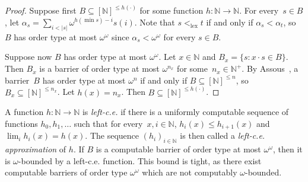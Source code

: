 \documentclass{article}
\newcommand{\NN}[0]{\mathbb{N}}
\newcommand{\lex}{\mathrm{lex}}
\newcommand{\base}{\operatorname{base}}
\numberwithin{theorem}{section}
\newtheorem{lemma}[theorem]{Lemma}
\newcommand{\ludovic}[1]{\textcolor{blue}{#1}}
\newcommand{\lorenzo}[1]{\textcolor{orange}{#1}}
\begin{document}
\begin{proof}
Suppose first $B \subseteq [\NN]^{\leq h(\cdot)}$ for some function $h : \NN \to \NN$.
For every~$s \in B$, let $\alpha_s = \sum_{i < |s|} \omega^{h(\min s)-i} s(i)$. %
Note that $s <_{\lex} t$ if and only if $\alpha_s < \alpha_t$, so $B$ has order type at most $\omega^\omega$ since $\alpha_s < \omega^{\omega}$ for every $s \in B$.

Suppose now $B$ has order type at most $\omega^{\omega}$. Let $x \in \NN$ and $B_x = \{ s : x \cdot s \in B \}$. Then $B_x$ is a barrier of order type at most $\omega^{n_x}$ for some~$n_x \in \NN^+$. By Assous~\cite[Proposition II.1]{assous1974caracterisation}, a barrier~$B$ has order type at most $\omega^n$ if and only if $B \subseteq [\NN]^{\leq n}$, so $B_x \subseteq [\NN]^{\leq n_x}$. Let $h(x) = n_x$. Then $B \subseteq [\NN]^{\leq h(\cdot)}$.
\end{proof}

A function $h : \NN \to \NN$ is \emph{left-c.e.} if there is a uniformly computable sequence of functions $h_0, h_1, \dots$ such that for every~$x, i \in \NN$, $h_i(x) \leq h_{i+1}(x)$ and $\lim_i h_i(x) = h(x)$. The sequence $(h_i)_{i\in\NN}$ is then called a \emph{left-c.e. approximation} of $h$.
If $B$ is a computable barrier of order type at most $\omega^\omega$, then it is $\omega$-bounded by a left-c.e. function. This bound is tight, as there exist computable barriers of order type $\omega^{\omega}$ which are not computably $\omega$-bounded.


\end{document}
